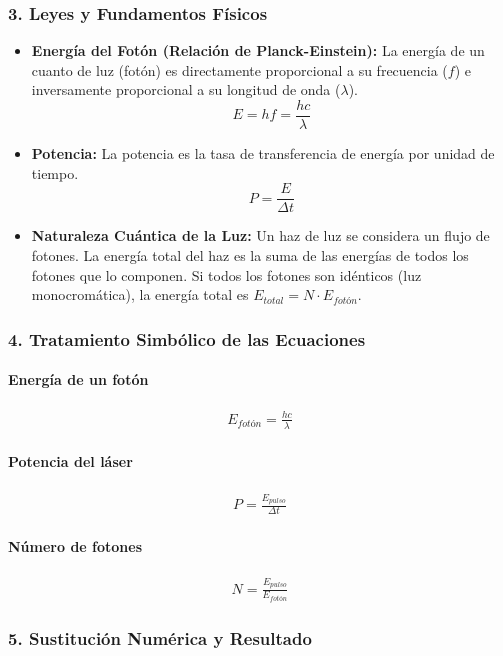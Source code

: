 \subsubsection*{3. Leyes y Fundamentos Físicos}
\begin{itemize}
    \item \textbf{Energía del Fotón (Relación de Planck-Einstein):} La energía de un cuanto de luz (fotón) es directamente proporcional a su frecuencia ($f$) e inversamente proporcional a su longitud de onda ($\lambda$).
    $$ E = hf = \frac{hc}{\lambda} $$
    \item \textbf{Potencia:} La potencia es la tasa de transferencia de energía por unidad de tiempo.
    $$ P = \frac{E}{\Delta t} $$
    \item \textbf{Naturaleza Cuántica de la Luz:} Un haz de luz se considera un flujo de fotones. La energía total del haz es la suma de las energías de todos los fotones que lo componen. Si todos los fotones son idénticos (luz monocromática), la energía total es $E_{total} = N \cdot E_{fotón}$.
\end{itemize}

\subsubsection*{4. Tratamiento Simbólico de las Ecuaciones}
\paragraph*{Energía de un fotón}
\begin{gather}
    E_{fotón} = \frac{hc}{\lambda}
\end{gather}
\paragraph*{Potencia del láser}
\begin{gather}
    P = \frac{E_{pulso}}{\Delta t}
\end{gather}
\paragraph*{Número de fotones}
\begin{gather}
    N = \frac{E_{pulso}}{E_{fotón}}
\end{gather}

\subsubsection*{5. Sustitución Numérica y Resultado}
